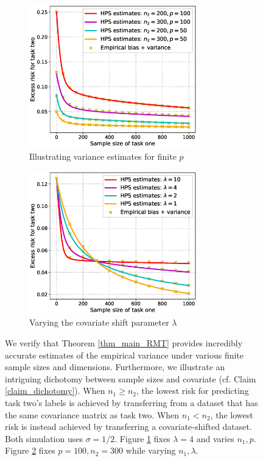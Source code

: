 \begin{figure}[!t]
	\begin{subfigure}[b]{0.5\textwidth}
		\centering
		\includegraphics[width=0.8\textwidth]{figures/verify_covariate_shift.eps}
		\caption{Illustrating variance estimates for finite $p$}
		\label{fig_sec3_verify_cov}
	\end{subfigure}
	\begin{subfigure}[b]{0.5\textwidth}
		\centering
		\includegraphics[width=0.8\textwidth]{figures/covariate_shift.eps}
		\caption{Varying the covariate shift parameter $\lambda$}
		\label{fig_sec3_covariate}
	\end{subfigure}
	\caption{We verify that Theorem \ref{thm_main_RMT} provides incredibly accurate estimates of the empirical variance under various finite sample sizes and dimensions.
	Furthermore, we illustrate an intriguing dichotomy between sample sizes and covariate (cf. Claim \ref{claim_dichotomy}).
	When $n_1 \ge n_2$, the lowest risk for predicting task two's labels is achieved by transferring from a dataset that has the same covariance matrix as task two. 
	When $n_1 < n_2$, the lowest risk is instead achieved by transferring a covariate-shifted dataset.
	Both simulation uses $\sigma = 1/2$.
	Figure \ref{fig_sec3_verify_cov} fixes $\lambda = 4$ and varies $n_1, p$.
	Figure \ref{fig_sec3_covariate} fixes $p = 100, n_2 = 300$ while varying $n_1, \lambda$.}
	\label{fig_sec31}
\end{figure}


